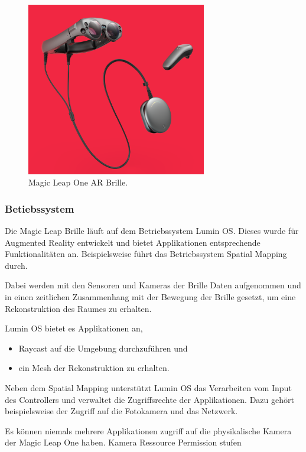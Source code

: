 \begin{figure}[H]
	\centering
	\includegraphics[width=0.7\textwidth]{images/img_magicLeap.PNG}
	\caption[]{Magic Leap One AR Brille.\citep{mlImage}}
	\label{viewManagement}
\end{figure}

\subsubsection{Betiebssystem}
Die Magic Leap Brille läuft auf dem Betriebssystem Lumin OS. Dieses wurde für Augmented Reality entwickelt und bietet Applikationen entsprechende Funktionalitäten an. Beispielsweise führt das Betriebssystem Spatial Mapping durch.\citep{mlluminOS,mlluminfeatures}

Dabei werden mit den Sensoren und Kameras der Brille Daten aufgenommen und in einen zeitlichen Zusammenhang mit der Bewegung der Brille gesetzt, um eine Rekonstruktion des Raumes zu erhalten.\citep{mlluminOS,mlluminfeatures,mlluminworldreconstruktion,mlmeshingunity}

Lumin OS bietet es Applikationen an,
\begin{itemize}
	\item Raycast auf die Umgebung durchzuführen und
	\item ein Mesh der Rekonstruktion zu erhalten.
\end{itemize}
Neben dem Spatial Mapping unterstützt Lumin OS das Verarbeiten vom Input des Controllers und verwaltet die Zugriffsrechte der Applikationen. Dazu gehört beispielsweise der Zugriff auf die Fotokamera und das Netzwerk.\citep{mlluminfeatures,mlappsecurity}

Es können niemals mehrere Applikationen zugriff auf die physikalische Kamera der Magic Leap One haben. Kamera Ressource
Permission stufen

